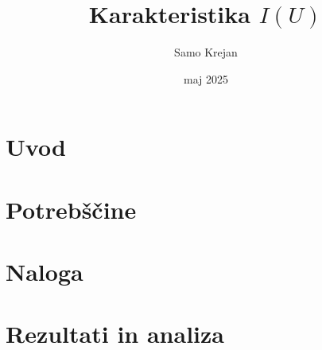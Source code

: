 \documentclass[12pt]{article}
\title{\textbf{Karakteristika $I(U)$}}
\author{Samo Krejan}
\date{maj 2025}
\begin{document}
\maketitle

\section{Uvod}


\section{Potrebščine}


\section{Naloga}


\section{Rezultati in analiza}
\end{document}
